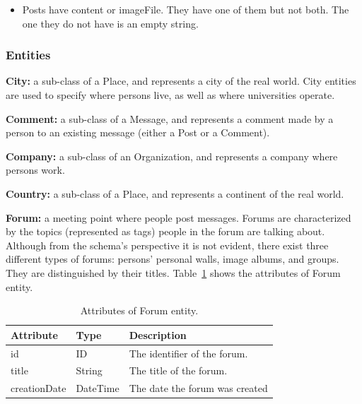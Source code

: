 \begin{itemize}
    \item Posts have content or imageFile. They have one of them but not both. The one they do not have is an empty string.
\end{itemize}

\subsubsection{Entities}

{\flushleft \textbf{City:}} a sub-class of a Place, and represents a
city of the real world. City entities are used to specify where persons live,
as well as where universities operate.

{\flushleft \textbf{Comment:}} a sub-class of a Message, and represents a
comment made by a person to an existing message (either a Post or a Comment).

{\flushleft \textbf{Company:}} a sub-class of an Organization, and represents a company where persons work.


{\flushleft \textbf{Country:}} a sub-class of a Place, and represents a continent of the real world.


{\flushleft \textbf{Forum:}} a meeting point where people
post messages. Forums are characterized by the topics (represented as tags)
people in the forum are talking about. Although from the schema's perspective
it is not evident, there exist three different types of
forums: persons' personal walls, image albums, and groups. They are
distinguished by their titles. Table~\ref{table:forum} shows the attributes
of Forum entity.

\begin{table}[H]
    \begin{tabular}{|p{2.5cm}|p{2.5cm}|p{10.5cm}|}
        \hline
        \textbf{Attribute} & \textbf{Type} & \textbf{Description} \\
        \hline
        id & ID  & The identifier of the forum.\\
        \hline
        title & String  & The title of the forum.\\
        \hline
        creationDate & DateTime  & The date the forum was created\\
        \hline
    \end{tabular}
    \caption{Attributes of Forum entity.}
    \label{table:forum}
\end{table}

